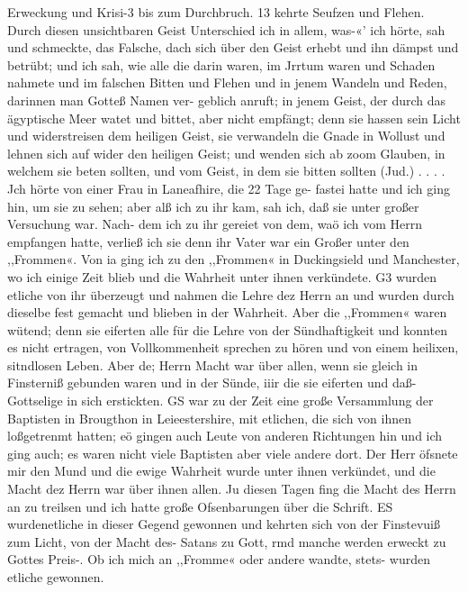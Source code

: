 Erweckung und Krisi-3 bis zum Durchbruch. 13
kehrte Seufzen und Flehen. Durch diesen unsichtbaren Geist
Unterschied ich in allem, was-«’ ich hörte, sah und schmeckte, das
Falsche, dach sich über den Geist erhebt und ihn dämpst und
betrübt; und ich sah, wie alle die darin waren, im Jrrtum waren
und Schaden nahmete und im falschen Bitten und Flehen und in
jenem Wandeln und Reden, darinnen man Gotteß Namen ver-
geblich anruft; in jenem Geist, der durch das ägyptische Meer
watet und bittet, aber nicht empfängt; denn sie hassen sein
Licht und widerstreisen dem heiligen Geist, sie verwandeln die
Gnade in Wollust und lehnen sich auf wider den heiligen Geist;
und wenden sich ab zoom Glauben, in welchem sie beten sollten,
und vom Geist, in dem sie bitten sollten (Jud.) . . . .
Jch hörte von einer Frau in Laneafhire, die 22 Tage ge-
fastei hatte und ich ging hin, um sie zu sehen; aber alß ich zu
ihr kam, sah ich, daß sie unter großer Versuchung war. Nach-
dem ich zu ihr gereiet von dem, waö ich vom Herrn empfangen
hatte, verließ ich sie denn ihr Vater war ein Großer unter den
,,Frommen«. Von ia ging ich zu den ,,Frommen« in Duckingsield
und Manchester, wo ich einige Zeit blieb und die Wahrheit unter
ihnen verkündete. G3 wurden etliche von ihr überzeugt und nahmen
die Lehre dez Herrn an und wurden durch dieselbe fest gemacht und
blieben in der Wahrheit. Aber die ,,Frommen« waren wütend;
denn sie eiferten alle für die Lehre von der Sündhaftigkeit und
konnten es nicht ertragen, von Vollkommenheit sprechen zu hören
und von einem heilixen, sitndlosen Leben. Aber de; Herrn Macht
war über allen, wenn sie gleich in Finsterniß gebunden waren
und in der Sünde, iiir die sie eiferten und daß- Gottselige in sich
erstickten. GS war zu der Zeit eine große Versammlung der
Baptisten in Brougthon in Leieestershire, mit etlichen, die sich
von ihnen loßgetrenmt hatten; eö gingen auch Leute von anderen
Richtungen hin und ich ging auch; es waren nicht viele Baptisten
aber viele andere dort. Der Herr öfsnete mir den Mund und
die ewige Wahrheit wurde unter ihnen verkündet, und die Macht
dez Herrn war über ihnen allen. Ju diesen Tagen fing die Macht
des Herrn an zu treilsen und ich hatte große Ofsenbarungen über die
Schrift. ES wurdenetliche in dieser Gegend gewonnen und kehrten
sich von der Finstevuiß zum Licht, von der Macht des- Satans zu
Gott, rmd manche werden erweckt zu Gottes Preis-. Ob ich mich an
,,Fromme« oder andere wandte, stets- wurden etliche gewonnen.



